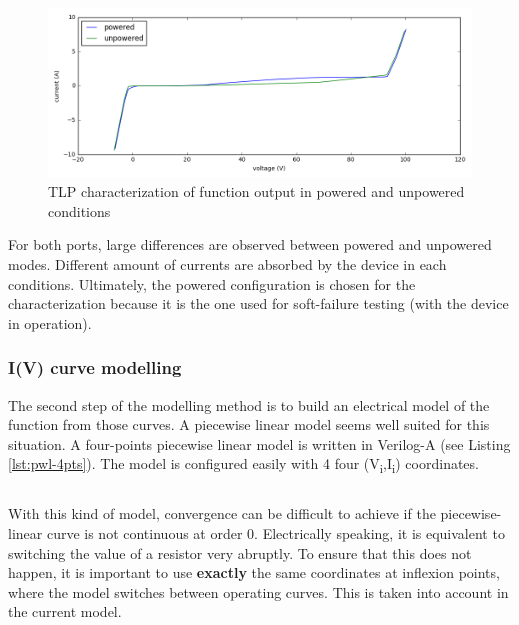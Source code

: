 \begin{figure}[!h]
  \centering
  \includegraphics[width=\textwidth]{src/4/figures/tlp_output_characterization.png}
  \caption{TLP characterization of function output in powered and unpowered conditions}
  \label{fig:tlp-output-cz}
\end{figure}

For both ports, large differences are observed between powered and unpowered modes.
Different amount of currents are absorbed by the device in each conditions.
Ultimately, the powered configuration is chosen for the characterization because it is the one used for soft-failure testing (with the device in operation).

\subsubsection{I(V) curve modelling}

The second step of the modelling method is to build an electrical model of the function from those curves.
A piecewise linear model seems well suited for this situation.
A four-points piecewise linear model is written in Verilog-A (see Listing \ref{lst:pwl-4pts}).
The model is configured easily with 4 four (V\textsubscript{i},I\textsubscript{i}) coordinates.

\begin{code}
\inputminted[frame=single]{verilog}{src/4/snippets/pwl_4pts.va}
\caption{Piecewise linear 4-points Verilog-A model}
\label{lst:pwl-4pts}
\end{code}

With this kind of model, convergence can be difficult to achieve if the piecewise-linear curve is not continuous at order 0.
Electrically speaking, it is equivalent to switching the value of a resistor very abruptly.
To ensure that this does not happen, it is important to use \textbf{exactly} the same coordinates at inflexion points, where the model switches between operating curves.
This is taken into account in the current model.

